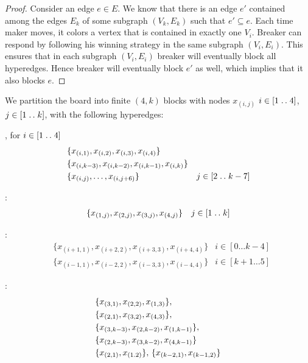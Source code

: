 \documentclass[conference]{IEEEtran}
\newcommand{\isep}{\mathrel{{.}\,{.}}\nobreak}
\theoremstyle{definition}
\begin{document}
\begin{proof}
Consider an edge $e \in E$. We know that there is an edge $e'$ contained among the edges $E_k$ of some subgraph $(V_k, E_k)$ such that $e' \subseteq e$.  Each time maker moves, it colors a vertex that is contained in exactly one $V_i$. Breaker can respond by following his winning strategy in the same subgraph $(V_i, E_i)$. This ensures that in each subgraph $(V_i, E_i)$ breaker will eventually block all hyperedges. Hence breaker will eventually block $e'$ as well, which implies that it also blocks $e$. 
\end{proof}


We  partition the board into finite $(4,k)$ blocks with nodes $x_{(i,j)}$ $i\in [1\isep 4]$, $j \in [1\isep k]$, with the following hyperedges:
    
, for $i \in [1\isep 4]$
        \begin{align}
        &\{x_{(i,1)},x_{(i,2)},x_{(i,3)},x_{(i,4)}\} \label{horizontal-4} \\
        &\{x_{(i,k-3)},x_{(i,k-2)},x_{(i,k-1)},x_{(i,k)}\} \label{7-line-def}\\
        &\{x_{(i,j)},\dots,x_{(i,j+6)}\} & j \in [2 \isep k-7]
    \end{align}
    
:
        \begin{align}
        &\{x_{(1,j)},x_{(2,j)},x_{(3,j)},x_{(4,j)}\} & j \in [1 \isep k] \label{vertical-4} 
        \end{align}
    
:
        \begin{align}
        &\{x_{(i+1,1)},x_{(i+2,2)},x_{(i+3,3)},x_{(i+4,4)}\} & i \in [0 \dots k-4] \label{cross-4-1}\\
        &\{x_{(i-1,1)},x_{(i-2,2)},x_{(i-3,3)},x_{(i-4,4)}\} & i \in [k+1 \dots 5] \label{cross-4-2}
        \end{align}
        
:
        \begin{align}
        &\{x_{(3,1)},x_{(2,2)},x_{(1,3)}\}, \notag \\ 
        &\{x_{(2,1)},x_{(3,2)},x_{(4,3)}\}, \notag \\
        &\{x_{(3,k-3)},x_{(2,k-2)},x_{(1,k-1)}\}, \notag \\ 
        &\{x_{(2,k-3)},x_{(3,k-2)},x_{(4,k-1)}\} \label{three-rules}\\
        & \{x_{(2,1)},x_{(1.2)}\}, \, \{x_{(k-2,1)},x_{(k-1,2)}\} \label{two-rules}
        \end{align}
\end{document}
